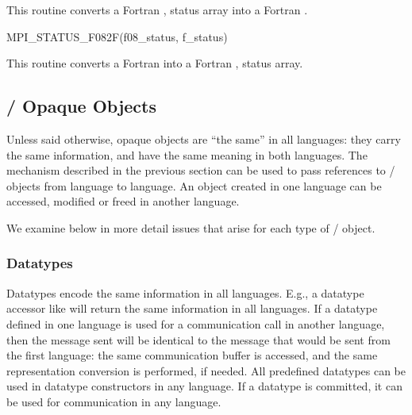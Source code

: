 This routine converts a Fortran ,  status array
into a Fortran  .

\begin{funcdef}{MPI\_STATUS\_F082F}{(\mbox{f08\_status}, \mbox{f\_status})}
\end{funcdef}

This routine converts a Fortran  
into a Fortran ,  status array.

\subsection{\texorpdfstring{\MPI/}{MPI} Opaque Objects}
\label{subsec:mpiopaqueobjects}

Unless said otherwise, opaque objects are ``the same'' in all languages:
they carry the same information, and have the same meaning in both
languages.  The mechanism described in the previous section can be
used to pass references to \MPI/ objects from language to language.
An object created in one language can be accessed, modified or freed
in another language.

We examine below in more detail issues that arise for each type of
\MPI/ object.

\subsubsection{Datatypes}
\label{sec:misc-datatypes}

Datatypes encode the same information in all languages.  E.g., a
datatype accessor like  will return the
same information in all languages.
If a datatype defined in
one language is used for a communication call in another language, then the
message sent will
be identical to the message that would be sent from the first language: the
same
communication buffer is accessed, and the same representation
conversion is performed, if needed.
All predefined
datatypes can be used in datatype constructors in any language. If
a datatype is committed, it can be used for
communication in any language.

